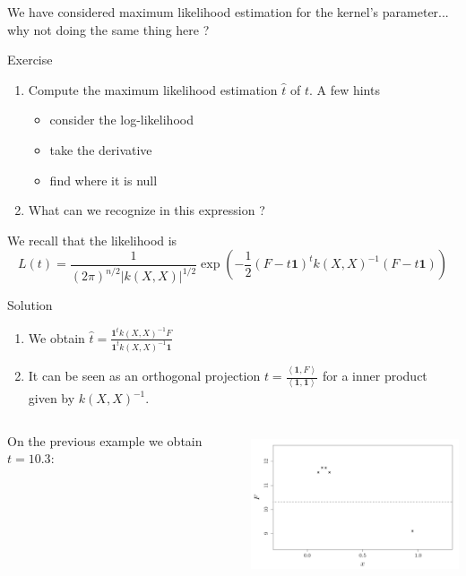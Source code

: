 \documentclass{beamer}
\newcommand\PSi[2]{{ \left \langle #1 \right \rangle}_{\! #2}}
\begin{document}
\begin{frame}{}
We have considered maximum likelihood estimation for the kernel's parameter... why not doing the same thing here ?
\begin{exampleblock}{Exercise}
\begin{enumerate}
	\item Compute the maximum likelihood estimation $\hat{t}$ of $t$. A few hints
	\begin{itemize}
		\item consider the log-likelihood
		\item take the derivative
		\item find where it is null
	\end{itemize}
	\item What can we recognize in this expression ?
\end{enumerate}
We recall that the likelihood is
\begin{equation*}
L(t) = \frac{1}{\displaystyle (2 \pi)^{n/2} |k(X,X)|^{1/2}} \exp \left(-\frac12 (F-t \mathbf{1})^t k(X,X)^{-1} (F-t \mathbf{1})  \right)
\end{equation*}
\end{exampleblock}
\end{frame}

\begin{frame}{}
\begin{exampleblock}{Solution}
\begin{enumerate}
	\item We obtain $ \displaystyle \hat{t} = \frac{\mathbf{1}^t k(X,X)^{-1} F}{\mathbf{1}^t k(X,X)^{-1} \mathbf{1}}$ 
	\item It can be seen as an orthogonal projection $ \displaystyle t = \frac{\PSi{\mathbf{1}, F}{}}{\PSi{\mathbf{1},\mathbf{1}}{}}$ for a inner product given by 
	$k(X,X)^{-1}$. 
\end{enumerate}
\end{exampleblock}
\begin{columns}[c]
\begin{column}{4cm}
On the previous example we obtain $t=10.3$:
\end{column}
\begin{column}{6cm}
\hspace{-8mm} \includegraphics[height=4.2cm]{figures/R/trend_estimordinary}
\end{column}
\end{columns}
\end{frame}
\end{document}
